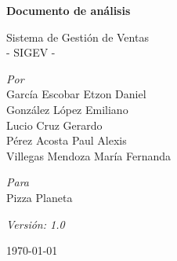 
\begin{titlepage}

    \centering %

    \LARGE{\textbf{Documento de análisis}}

    \vspace{1cm} %

    \LARGE{Sistema de Gestión de Ventas\\}
    \LARGE{- SIGEV -}

    \vspace{1cm} %

   \textit{Por}\\
    García Escobar Etzon Daniel \\
    González López Emiliano \\
    Lucio Cruz Gerardo \\
    Pérez Acosta Paul Alexis\\
    Villegas Mendoza María Fernanda

    \vspace{1cm} %

	\textit{Para}\\
	Pizza Planeta

     \vspace{1cm} %

	\textit{Versión: 1.0}\\ 

    \vspace{1cm} %

	\today %

\end{titlepage}
